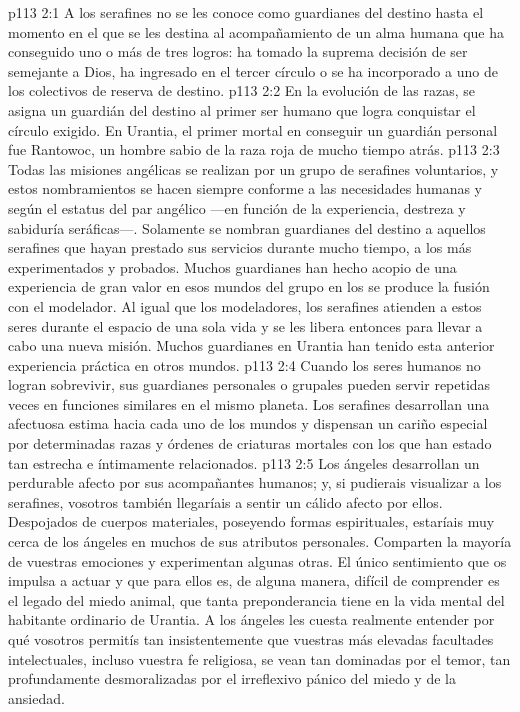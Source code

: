 \vs p113 2:1 A los serafines no se les conoce como guardianes del destino hasta el momento en el que se les destina al acompañamiento de un alma humana que ha conseguido uno o más de tres logros: ha tomado la suprema decisión de ser semejante a Dios, ha ingresado en el tercer círculo o se ha incorporado a uno de los colectivos de reserva de destino.
\vs p113 2:2 En la evolución de las razas, se asigna un guardián del destino al primer ser humano que logra conquistar el círculo exigido. En Urantia, el primer mortal en conseguir un guardián personal fue Rantowoc, un hombre sabio de la raza roja de mucho tiempo atrás.
\vs p113 2:3 Todas las misiones angélicas se realizan por un grupo de serafines voluntarios, y estos nombramientos se hacen siempre conforme a las necesidades humanas y según el estatus del par angélico ---en función de la experiencia, destreza y sabiduría seráficas---. Solamente se nombran guardianes del destino a aquellos serafines que hayan prestado sus servicios durante mucho tiempo, a los más experimentados y probados. Muchos guardianes han hecho acopio de una experiencia de gran valor en esos mundos del grupo en los se produce la fusión con el modelador. Al igual que los modeladores, los serafines atienden a estos seres durante el espacio de una sola vida y se les libera entonces para llevar a cabo una nueva misión. Muchos guardianes en Urantia han tenido esta anterior experiencia práctica en otros mundos.
\vs p113 2:4 \pc Cuando los seres humanos no logran sobrevivir, sus guardianes personales o grupales pueden servir repetidas veces en funciones similares en el mismo planeta. Los serafines desarrollan una afectuosa estima hacia cada uno de los mundos y dispensan un cariño especial por determinadas razas y órdenes de criaturas mortales con los que han estado tan estrecha e íntimamente relacionados.
\vs p113 2:5 Los ángeles desarrollan un perdurable afecto por sus acompañantes humanos; y, si pudierais visualizar a los serafines, vosotros también llegaríais a sentir un cálido afecto por ellos. Despojados de cuerpos materiales, poseyendo formas espirituales, estaríais muy cerca de los ángeles en muchos de sus atributos personales. Comparten la mayoría de vuestras emociones y experimentan algunas otras. El único sentimiento que os impulsa a actuar y que para ellos es, de alguna manera, difícil de comprender es el legado del miedo animal, que tanta preponderancia tiene en la vida mental del habitante ordinario de Urantia. A los ángeles les cuesta realmente entender por qué vosotros permitís tan insistentemente que vuestras más elevadas facultades intelectuales, incluso vuestra fe religiosa, se vean tan dominadas por el temor, tan profundamente desmoralizadas por el irreflexivo pánico del miedo y de la ansiedad.
